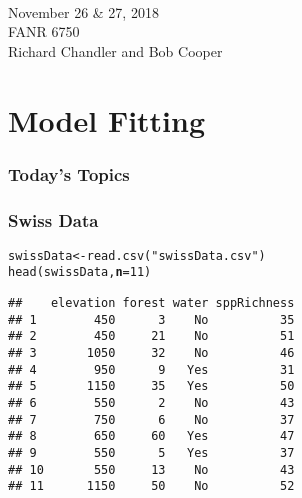 \documentclass[color=usenames,dvipsnames]{beamer}\usepackage[]{graphicx}\usepackage[]{color}
\makeatletter
\newcommand{\hlnum}[1]{\textcolor[rgb]{0.69,0.494,0}{#1}}%
\newcommand{\hlstr}[1]{\textcolor[rgb]{0.749,0.012,0.012}{#1}}%
\newcommand{\hlstd}[1]{\textcolor[rgb]{0,0,0}{#1}}%
\newcommand{\hlkwb}[1]{\textcolor[rgb]{0,0.341,0.682}{#1}}%
\newcommand{\hlkwc}[1]{\textcolor[rgb]{0,0,0}{\textbf{#1}}}%
\newcommand{\hlkwd}[1]{\textcolor[rgb]{0.004,0.004,0.506}{#1}}%
\newenvironment{kframe}{%
 \def\at@end@of@kframe{}%
 \ifinner\ifhmode%
  \def\at@end@of@kframe{\end{minipage}}%
  \begin{minipage}{\columnwidth}%
 \fi\fi%
 \def\FrameCommand##1{\hskip\@totalleftmargin \hskip-\fboxsep
 \colorbox{shadecolor}{##1}\hskip-\fboxsep
     \hskip-\linewidth \hskip-\@totalleftmargin \hskip\columnwidth}%
 \MakeFramed {\advance\hsize-\width
   \@totalleftmargin\z@ \linewidth\hsize
   \@setminipage}}%
 {\par\unskip\endMakeFramed%
 \at@end@of@kframe}
\newenvironment{knitrout}{}{} %
\makeatother
\begin{document}



\begin{frame}[plain]
  \centering \huge
  {\color{RoyalBlue}{Lab 14 -- Model Selection and Multimodel Inference}} \\
  \vspace{1cm}
  \LARGE
  November 26 \& 27, 2018 \\
  FANR 6750 \\
  \vfill
  \large
  Richard Chandler and Bob Cooper
\end{frame}




\section{Model Fitting}



\begin{frame}[plain]
  \frametitle{Today's Topics}
  \LARGE
\end{frame}




\begin{frame}[fragile]
  \frametitle{Swiss Data}
\begin{knitrout}\small
{}\color{fgcolor}\begin{kframe}
\begin{alltt}
\hlstd{swissData} \hlkwb{<-} \hlkwd{read.csv}\hlstd{(}\hlstr{"swissData.csv"}\hlstd{)}
\hlkwd{head}\hlstd{(swissData,} \hlkwc{n}\hlstd{=}\hlnum{11}\hlstd{)}
\end{alltt}
\begin{verbatim}
##    elevation forest water sppRichness
## 1        450      3    No          35
## 2        450     21    No          51
## 3       1050     32    No          46
## 4        950      9   Yes          31
## 5       1150     35   Yes          50
## 6        550      2    No          43
## 7        750      6    No          37
## 8        650     60   Yes          47
## 9        550      5   Yes          37
## 10       550     13    No          43
## 11      1150     50    No          52
\end{verbatim}
\end{kframe}
\end{knitrout}
\end{frame}
\end{document}
